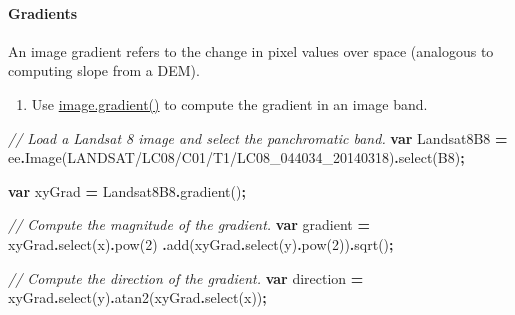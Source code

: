 \documentclass[
]{article}
\newenvironment{Shaded}{\begin{snugshade}}{\end{snugshade}}
\newcommand{\CommentTok}[1]{\textcolor[rgb]{0.56,0.35,0.01}{\textit{#1}}}
\newcommand{\DecValTok}[1]{\textcolor[rgb]{0.00,0.00,0.81}{#1}}
\newcommand{\FunctionTok}[1]{\textcolor[rgb]{0.00,0.00,0.00}{#1}}
\newcommand{\KeywordTok}[1]{\textcolor[rgb]{0.13,0.29,0.53}{\textbf{#1}}}
\newcommand{\NormalTok}[1]{#1}
\newcommand{\OperatorTok}[1]{\textcolor[rgb]{0.81,0.36,0.00}{\textbf{#1}}}
\newcommand{\StringTok}[1]{\textcolor[rgb]{0.31,0.60,0.02}{#1}}
\providecommand{\tightlist}{%
  \setlength{\itemsep}{0pt}\setlength{\parskip}{0pt}}
\begin{document}
\hypertarget{gradients}{%
\paragraph{Gradients}\label{gradients}}

An image gradient refers to the change in pixel values over space (analogous to computing slope from a DEM).

\begin{enumerate}
\def\labelenumi{\roman{enumi}.}
\tightlist
\item
  Use \href{https://developers.google.com/earth-engine/guides/image_gradients}{image.gradient()} to compute the gradient in an image band.
\end{enumerate}

\begin{Shaded}
\begin{Highlighting}[]
   \CommentTok{// Load a Landsat 8 image and select the panchromatic band.}
  \KeywordTok{var}\NormalTok{ Landsat8B8 }\OperatorTok{=}\NormalTok{ ee}\OperatorTok{.}\FunctionTok{Image}\NormalTok{(}\StringTok{\textquotesingle{}LANDSAT/LC08/C01/T1/LC08\_044034\_20140318\textquotesingle{}}\NormalTok{)}\OperatorTok{.}\FunctionTok{select}\NormalTok{(}\StringTok{\textquotesingle{}B8\textquotesingle{}}\NormalTok{)}\OperatorTok{;}
  
  \KeywordTok{var}\NormalTok{ xyGrad }\OperatorTok{=}\NormalTok{ Landsat8B8}\OperatorTok{.}\FunctionTok{gradient}\NormalTok{()}\OperatorTok{;}
  
  \CommentTok{// Compute the magnitude of the gradient.}
  \KeywordTok{var}\NormalTok{ gradient }\OperatorTok{=}\NormalTok{ xyGrad}\OperatorTok{.}\FunctionTok{select}\NormalTok{(}\StringTok{\textquotesingle{}x\textquotesingle{}}\NormalTok{)}\OperatorTok{.}\FunctionTok{pow}\NormalTok{(}\DecValTok{2}\NormalTok{)}
            \OperatorTok{.}\FunctionTok{add}\NormalTok{(xyGrad}\OperatorTok{.}\FunctionTok{select}\NormalTok{(}\StringTok{\textquotesingle{}y\textquotesingle{}}\NormalTok{)}\OperatorTok{.}\FunctionTok{pow}\NormalTok{(}\DecValTok{2}\NormalTok{))}\OperatorTok{.}\FunctionTok{sqrt}\NormalTok{()}\OperatorTok{;}
  
  \CommentTok{// Compute the direction of the gradient.}
  \KeywordTok{var}\NormalTok{ direction }\OperatorTok{=}\NormalTok{ xyGrad}\OperatorTok{.}\FunctionTok{select}\NormalTok{(}\StringTok{\textquotesingle{}y\textquotesingle{}}\NormalTok{)}\OperatorTok{.}\FunctionTok{atan2}\NormalTok{(xyGrad}\OperatorTok{.}\FunctionTok{select}\NormalTok{(}\StringTok{\textquotesingle{}x\textquotesingle{}}\NormalTok{))}\OperatorTok{;}
\end{Highlighting}
\end{Shaded}
\end{document}
